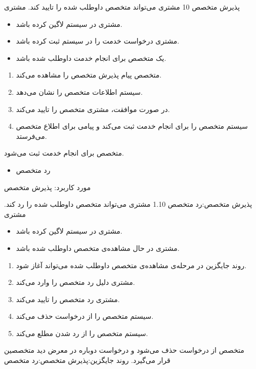 {
\usecase
{پذیرش متخصص}
{10}
{مشتری می‌تواند متخصص داوطلب شده را تایید کند.}
{مشتری}
{}
{	
	\begin{itemize}
		\vspace*{-0.6cm}
		\item 
		مشتری در سیستم لاگین کرده باشد.
		\item
		مشتری درخواست خدمت را در سیستم ثبت کرده باشد.
		\item
		یک متخصص برای انجام خدمت داوطلب شده باشد.
	\end{itemize}
}
{
	\vspace*{-0.6cm}
	\begin{enumerate}
		\item
					متخصص پیام پذیرش متخصص را مشاهده می‌کند.
		\item
سیستم اطلاعات متخصص را نشان می‌دهد.
		\item 
		در صورت موافقت، مشتری متخصص را تایید می‌کند.
		\item 
		سیستم متخصص را برای انجام خدمت ثبت می‌کند و پیامی برای اطلاع متخصص می‌فرستد.
	\end{enumerate}
}
{متخصص برای انجام خدمت ثبت می‌شود.}
{
	\begin{itemize}
		\vspace*{-0.6cm}
		\item
		رد متخصص
	\end{itemize}
}
{
	مورد کاربرد: پذیرش متخصص
}

\alternativeflow
{
	 پذیرش متخصص:رد متخصص
}
{1.10}
{
	مشتری می‌تواند متخصص داوطلب شده را رد کند.
}
{
	مشتری
}
{}
{
	\begin{itemize}
		\vspace*{-0.6cm}
		\item 
		مشتری در سیستم لاگین کرده باشد.
		\item
		مشتری در حال مشاهده‌ی متخصص داوطلب شده باشد.
	\end{itemize}
}
{
	\vspace*{-0.6cm}
	\begin{enumerate}
		\item 
		روند جایگزین در مرحله‌ی مشاهده‌ی متخصص داوطلب شده می‌تواند آغاز شود.
		\item
		مشتری دلیل رد متخصص را وارد می‌کند.
		\item
		مشتری رد متخصص را تایید می‌کند.
			\item
			سیستم متخصص را از درخواست حذف می‌کند.
		\item
		سیستم متخصص را از رد شدن مطلع می‌کند.
	\end{enumerate}
}
{
متخصص از درخواست حذف می‌شود و درخواست دوباره در معرض دید متخصصین قرار می‌گیرد.
}
{
روند جایگزین:پذیرش متخصص:رد متخصص
}
}


